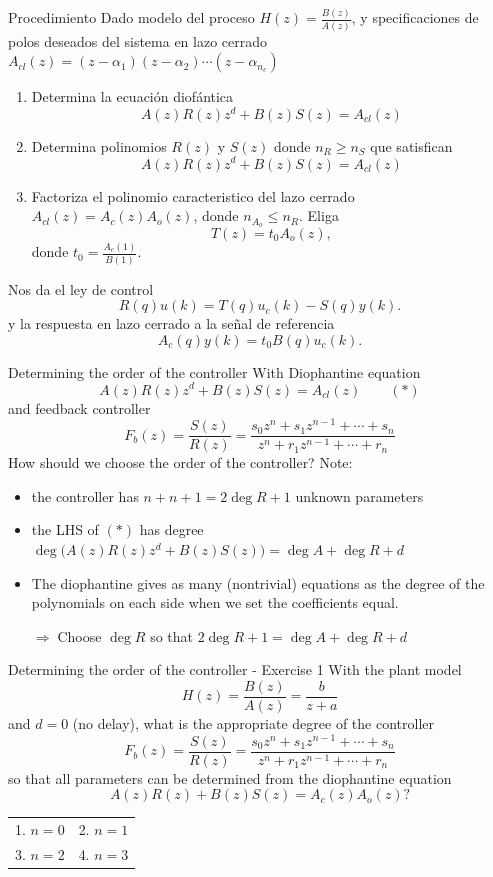 \documentclass[presentation,aspectratio=169]{beamer}
\begin{document}
\begin{frame}[label={sec:org9ec9e5d}]{Procedimiento}
Dado modelo del proceso \(H(z)=\frac{B(z)}{A(z)}\), y specificaciones de polos deseados del sistema en lazo cerrado \(A_{cl}(z) = (z-\alpha_1)(z-\alpha_2) \cdots (z-\alpha_{n_c})\)
\begin{enumerate}
\item Determina la ecuación diofántica
\[ A(z)R(z)z^{d} + B(z)S(z) = A_{cl}(z) \]
\item Determina polinomios \(R(z)\) y \(S(z)\) donde \(n_R \ge n_S\) que satisfican
\[ A(z)R(z)z^{d} + B(z)S(z) = A_{cl}(z) \]
\item Factoriza el polinomio caracteristico del lazo cerrado \(A_{cl}(z) = A_c(z)A_o(z)\), donde \(n_{A_o} \le n_R\). Eliga
\[T(z) = t_0 A_o(z),\] donde \(t_0 = \frac{A_c(1)}{B(1)}\).
\end{enumerate}

Nos da el ley de control 
\[ R(q) u(k) = T(q)u_c(k) - S(q)y(k). \]
y la respuesta en lazo cerrado a la señal de referencia
\[ A_c(q)y(k) = t_0 B(q) u_c(k). \]
\end{frame}
\begin{frame}[label={sec:org96b8351}]{Determining the order of the controller}
With Diophantine equation 
   \[ A(z)R(z)z^{d} + B(z)S(z) = A_{cl}(z) \qquad (*) \]
and feedback controller
\[F_b(z) = \frac{S(z)}{R(z)} = \frac{s_0z^n + s_1z^{n-1} + \cdots + s_n}{z^n + r_1 z^{n-1} + \cdots + r_n}\]
\alert{How should we choose the order of the controller?} Note:
\begin{itemize}
\item the controller has \(n+n+1 = 2\deg R + 1\) unknown parameters
\item the LHS of \((*)\) has degree \(\deg \big(A(z)R(z)z^d + B(z)S(z)\big) = \deg A + \deg R + d\)
\item The diophantine gives as many (nontrivial) equations as the degree of the polynomials on each side when we set the coefficients equal.

\alert{\(\Rightarrow\;\)Choose \(\deg R\) so that \(2\deg R + 1 = \deg A + \deg R + d\)}
\end{itemize}
\end{frame}


\begin{frame}[label={sec:org658f8e5}]{Determining the order of the controller - Exercise 1}
With the plant model \[H(z) = \frac{B(z)}{A(z)} = \frac{b}{z + a}\] and \(d=0\) (no delay), what is the appropriate degree of the controller 
\[F_b(z) = \frac{S(z)}{R(z)} = \frac{s_0z^n + s_1z^{n-1} + \cdots + s_n}{z^n + r_1 z^{n-1} + \cdots + r_n}\]
so that all parameters can be determined from the diophantine equation
\[ A(z)R(z) + B(z)S(z) = A_c(z)A_o(z)?\]
\begin{center}
\begin{tabular}{ll}
1. \(n = 0\) & 2. \(n = 1\)\\
3. \(n=2\) & 4. \(n=3\)\\
\end{tabular}
\end{center}
\end{frame}
\end{document}
